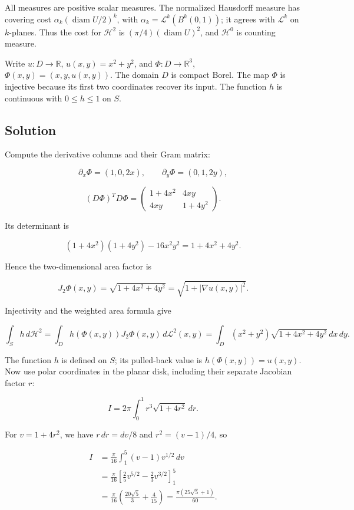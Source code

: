 \documentclass[
  11pt,
]{article}
\begin{document}
All measures are positive scalar measures. The normalized Hausdorff
measure has covering cost \(\alpha_k(\operatorname{diam}U/2)^k\), with
\(\alpha_k=\mathcal L^k(B^k(0,1))\); it agrees with \(\mathcal L^k\) on
\(k\)-planes. Thus the cost for \(\mathcal H^2\) is
\((\pi/4)(\operatorname{diam}U)^2\), and \(\mathcal H^0\) is counting
measure.

Write \(u:D\to\mathbb R\), \(u(x,y)=x^2+y^2\), and
\(\Phi:D\to\mathbb R^3\), \(\Phi(x,y)=(x,y,u(x,y))\). The domain \(D\)
is compact Borel. The map \(\Phi\) is injective because its first two
coordinates recover its input. The function \(h\) is continuous with
\(0\leq h\leq1\) on \(S\).

\subsection{Solution}\label{solution-8}

Compute the derivative columns and their Gram matrix:

\[
\partial_x\Phi=(1,0,2x),\qquad
\partial_y\Phi=(0,1,2y),
\]

\[
(D\Phi)^T D\Phi=
\begin{pmatrix}1+4x^2&4xy\\4xy&1+4y^2\end{pmatrix}.
\]

Its determinant is

\[
(1+4x^2)(1+4y^2)-16x^2y^2=1+4x^2+4y^2.
\]

Hence the two-dimensional area factor is

\[
J_2\Phi(x,y)=\sqrt{1+4x^2+4y^2}
=\sqrt{1+|\nabla u(x,y)|^2}.
\]

Injectivity and the weighted area formula give

\[
\int_S h\,d\mathcal H^2
=\int_D h(\Phi(x,y))J_2\Phi(x,y)\,d\mathcal L^2(x,y)
=\int_D(x^2+y^2)\sqrt{1+4x^2+4y^2}\,dx\,dy.
\]

The function \(h\) is defined on \(S\); its pulled-back value is
\(h(\Phi(x,y))=u(x,y)\). Now use polar coordinates in the planar disk,
including their separate Jacobian factor \(r\):

\[
I=2\pi\int_0^1 r^3\sqrt{1+4r^2}\,dr.
\]

For \(v=1+4r^2\), we have \(r\,dr=dv/8\) and \(r^2=(v-1)/4\), so

\[
\begin{aligned}
I&=\frac{\pi}{16}\int_1^5(v-1)v^{1/2}\,dv\\
&=\frac{\pi}{16}\left[\frac25v^{5/2}-\frac23v^{3/2}\right]_1^5\\
&=\frac{\pi}{16}\left(\frac{20\sqrt5}{3}+\frac4{15}\right)
=\boxed{\frac{\pi(25\sqrt5+1)}{60}}.
\end{aligned}
\]
\end{document}
